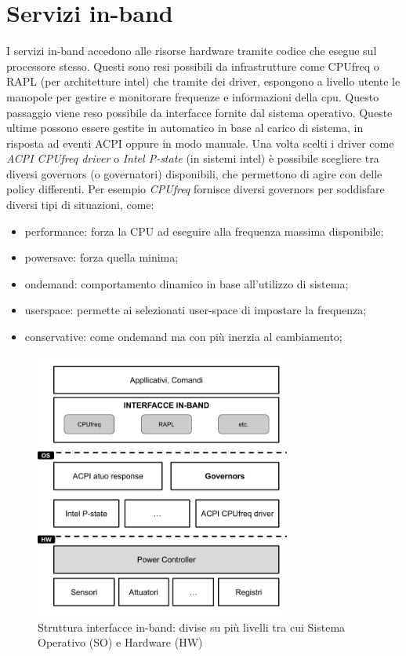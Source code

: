 
\section{Servizi in-band}
I servizi in-band accedono alle risorse hardware tramite codice che esegue sul processore stesso. Questi sono resi possibili da infrastrutture come CPUfreq\cite{CPUfreq} o RAPL\cite{RAPL} (per architetture intel) che tramite dei driver, espongono a livello utente le manopole per gestire e monitorare frequenze e informazioni della cpu. Questo passaggio viene reso possibile da interfacce fornite dal sistema operativo. Queste ultime possono essere gestite in automatico in base al carico di sistema, in risposta ad eventi ACPI oppure in modo manuale. Una volta scelti i driver come \emph{ACPI CPUfreq driver} o \emph{Intel P-state} (in sistemi intel) è possibile scegliere tra diversi governors (o governatori) disponibili, che permettono di agire con delle policy differenti.
Per esempio \emph{CPUfreq} fornisce diversi governors per soddisfare diversi tipi di situazioni, come:
\begin{itemize}
    \item performance: forza la CPU ad eseguire alla frequenza massima disponibile;
    \item powersave: forza quella minima;
    \item ondemand: comportamento dinamico in base all'utilizzo di sistema;
    \item userspace: permette ai selezionati user-space di impostare la frequenza; 
    \item conservative: come ondemand ma con più inerzia al cambiamento;
\end{itemize}

\begin{figure}[H]
    \centering
    \includegraphics[width=0.75\textwidth]{img/in-band.png}
    \caption{Struttura interfacce in-band: divise su più livelli tra cui Sistema Operativo (SO) e Hardware (HW)}\label{fig:inband}
\end{figure}

